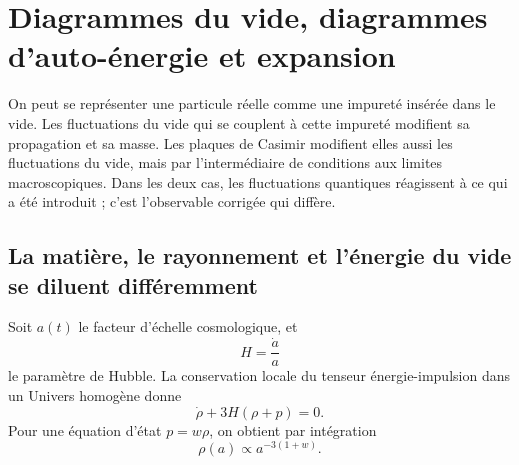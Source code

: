 \section{Diagrammes du vide, diagrammes d’auto-énergie et expansion}

\begin{classroomqa}
\end{classroomqa}

On peut se représenter une particule réelle comme une impureté insérée dans le vide. Les fluctuations du vide qui se couplent à cette impureté modifient sa propagation et sa masse. Les plaques de Casimir modifient elles aussi les fluctuations du vide, mais par l’intermédiaire de conditions aux limites macroscopiques. Dans les deux cas, les fluctuations quantiques réagissent à ce qui a été introduit ; c’est l’observable corrigée qui diffère.

\vspace{-2pt}\subsection{La matière, le rayonnement et l’énergie du vide se diluent différemment}

Soit \(a(t)\) le facteur d’échelle cosmologique, et
\begin{equation}
H=\frac{\dot a}{a}
\end{equation}
le paramètre de Hubble. La conservation locale du tenseur énergie-impulsion dans un Univers homogène donne
\begin{equation}
\dot\rho+3H(\rho+p)=0.
\end{equation}
Pour une équation d’état \(p=w\rho\), on obtient par intégration
\begin{equation}
\rho(a)\propto a^{-3(1+w)}.
\end{equation}

